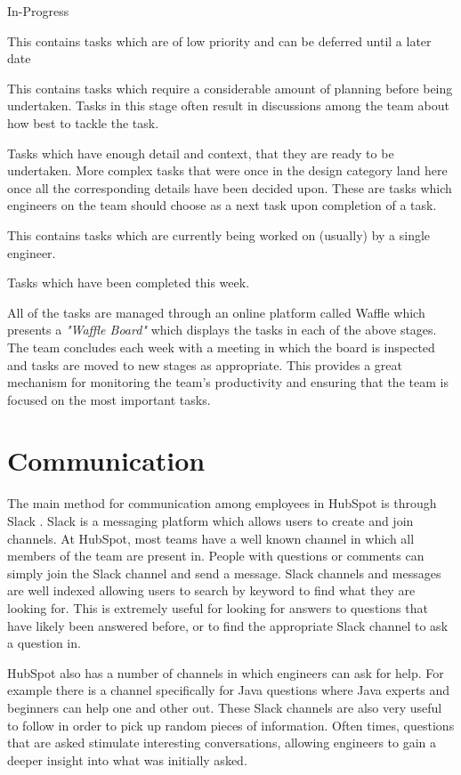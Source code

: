\begin{labeling}{In-Progress}
	\item [Backlog] This contains tasks which are of low priority and can be deferred until a later date
	\item [Design] This contains tasks which require a considerable amount of planning before being undertaken. Tasks in this stage often result in discussions among the team about how best to tackle the task.
	\item [Ready] Tasks which have enough detail and context, that they are ready to be undertaken. More complex tasks that were once in the design category land here once all the corresponding details have been decided upon. These are tasks which engineers on the team should choose as a next task upon completion of a task.
	\item [In-Progress] This contains tasks which are currently being worked on (usually) by a single engineer.
	\item [Completed] Tasks which have been completed this week.
\end{labeling}

All of the tasks are managed through an online platform called Waffle \cite{waffle} which presents a \textit{"Waffle Board"} which displays the tasks in each of the above stages. The team concludes each week with a meeting in which the board is inspected and tasks are moved to new stages as appropriate. This provides a great mechanism for monitoring the team's productivity and ensuring that the team is focused on the most important tasks. 

\section{Communication}
The main method for communication among employees in HubSpot is through Slack \cite{slack}. Slack is a messaging platform which allows users to create and join channels. At HubSpot, most teams have a well known channel in which all members of the team are present in. People with questions or comments can simply join the Slack channel and send a message. Slack channels and messages are well indexed allowing users to search by keyword to find what they are looking for. This is extremely useful for looking for answers to questions that have likely been answered before, or to find the appropriate Slack channel to ask a question in.

HubSpot also has a number of channels in which engineers can ask for help. For example there is a channel specifically for Java questions where Java experts and beginners can help one and other out. These Slack channels are also very useful to follow in order to pick up random pieces of information. Often times, questions that are asked stimulate interesting conversations, allowing engineers to gain a deeper insight into what was initially asked.

